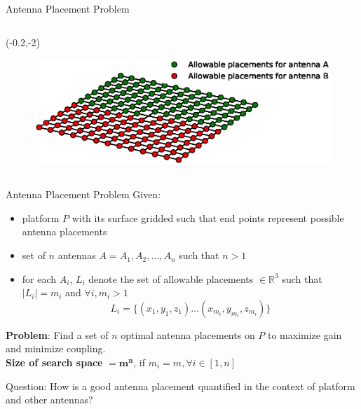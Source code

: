 \documentclass{beamer}
\begin{document}
\begin{frame}{Antenna Placement Problem}
\begin{columns}
{            \begin{textblock}{3}(-0.2,-2)
                \begin{figure}
                    \includegraphics[trim=170 165 65 145, clip, scale=0.4]{../paper/FIG/tc1_intro}
                \end{figure}\end{textblock}
        }
    \end{columns}
\end{frame}

\begin{frame}[t]{Antenna Placement Problem}
    Given:
\begin{itemize} \itemsep1.5em
        \item platform $P$ with its surface gridded such that end points represent possible antenna placements
        \item set of  $n$ antennas $A = {A_1, A_2, \dots, A_n}$ such that $n > 1$
        \item for each $A_i$, $L_i$ denote the set of allowable placements $\in \mathbb R^3$ such that $\mid L_i \mid = m_i$ and $\forall i, m_i > 1$\[ L_i = \{(x_{1}, y_{1}, z_{1}) \dots (x_{m_i}, y_{m_i}, z_{m_i})\} \]
    \end{itemize}
    \textbf{Problem}: Find a set of $n$ optimal antenna placements on $P$ to maximize gain and minimize coupling. \\
    \vspace*{2mm}
    \textbf{Size of search space} $= \mathbf{m^n}$, if $m_i = m, \forall i \in [1,n]$
\end{frame}

\begin{frame}{\null}
    \begin{tcolorbox}[colback=green!5]
        \centering
        Question: How is a good antenna placement quantified in the context of platform and other antennas?
    \end{tcolorbox}
\end{frame}
\end{document}
